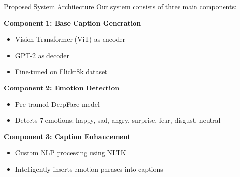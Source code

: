 \documentclass{beamer}
\begin{document}
\begin{frame}{Proposed System Architecture}
    Our system consists of three main components:
    
    \vspace{0.5cm}
    \textbf{Component 1: Base Caption Generation}
    \begin{itemize}
        \item Vision Transformer (ViT) as encoder
        \item GPT-2 as decoder
        \item Fine-tuned on Flickr8k dataset
    \end{itemize}
    
    \vspace{0.3cm}
    \textbf{Component 2: Emotion Detection}
    \begin{itemize}
        \item Pre-trained DeepFace model
        \item Detects 7 emotions: happy, sad, angry, surprise, fear, disgust, neutral
    \end{itemize}
    
    \vspace{0.3cm}
    \textbf{Component 3: Caption Enhancement}
    \begin{itemize}
        \item Custom NLP processing using NLTK
        \item Intelligently inserts emotion phrases into captions
    \end{itemize}
\end{frame}

    
    
\end{document}
